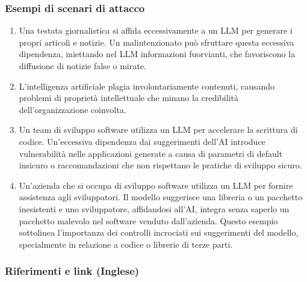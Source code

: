 \documentclass[
]{article}
\providecommand{\tightlist}{%
  \setlength{\itemsep}{0pt}\setlength{\parskip}{0pt}}
\begin{document}
\subsubsection{Esempi di scenari di
attacco}\label{esempi-di-scenari-di-attacco}

\begin{enumerate}
\def\labelenumi{\arabic{enumi}.}
\tightlist
\item
  Una testata giornalistica si affida eccessivamente a un LLM per
  generare i propri articoli e notizie. Un malintenzionato può sfruttare
  questa eccessiva dipendenza, iniettando nel LLM informazioni
  fuorvianti, che favoriscono la diffusione di notizie false o mirate.
\item
  L'intelligenza artificiale plagia involontariamente contenuti,
  causando problemi di proprietà intellettuale che minano la credibilità
  dell'organizzazione coinvolta.
\item
  Un team di sviluppo software utilizza un LLM per accelerare la
  scrittura di codice. Un'eccessiva dipendenza dai suggerimenti dell'AI
  introduce vulnerabilità nelle applicazioni generate a causa di
  parametri di default insicuro o raccomandazioni che non rispettano le
  pratiche di sviluppo sicuro.
\item
  Un'azienda che si occupa di sviluppo software utilizza un LLM per
  fornire assistenza agli sviluppatori. Il modello suggerisce una
  libreria o un pacchetto inesistenti e uno sviluppatore, affidandosi
  all'AI, integra senza saperlo un pacchetto malevolo nel software
  venduto dall'azienda. Questo esempio sottolinea l'importanza dei
  controlli incrociati sui suggerimenti del modello, specialmente in
  relazione a codice o librerie di terze parti.
\end{enumerate}

\subsubsection{Riferimenti e link
(Inglese)}\label{riferimenti-e-link-inglese}
\end{document}
